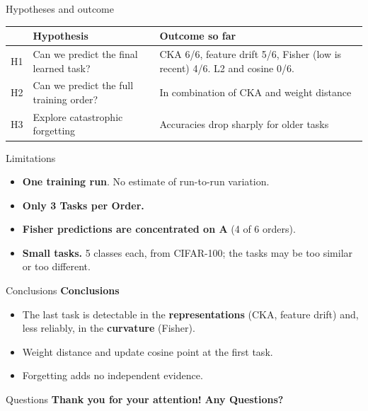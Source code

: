 \documentclass[aspectratio=169,11pt]{beamer}
\newcommand{\hl}[1]{{\color{accent}\bfseries #1}}
\begin{document}
\begin{frame}{Hypotheses and outcome}
  \small
  \renewcommand{\arraystretch}{1.3}
  \begin{tabular}{@{}p{0.6cm}p{4.6cm}p{6.6cm}@{}}
    \toprule
    & \textbf{Hypothesis} & \textbf{Outcome so far}\\
    \midrule
    H1 & Can we predict the final learned task? & CKA 6/6, feature drift 5/6, Fisher (low is recent) 4/6. L2 and cosine 0/6.\\
    H2 & Can we predict the full training order? & In combination of CKA and weight distance\\
    H3 & Explore catastrophic forgetting & Accuracies drop sharply for older tasks\\
    \bottomrule
  \end{tabular}
\end{frame}

\begin{frame}{Limitations}
  \begin{itemize}
    \item \textbf{One training run}. No estimate of run-to-run variation.
     \bigskip 
    \item \textbf{Only 3 Tasks per Order.} 
     \bigskip
     \item \textbf{Fisher predictions are concentrated on A} (4 of 6 orders).
     \bigskip
    \item \textbf{Small tasks.} 5 classes each, from CIFAR-100; the tasks may be too similar or too different.
  \end{itemize}
\end{frame}

\begin{frame}{Conclusions}
      \textbf{Conclusions}
      \bigskip
      \begin{itemize}
        \item The last task is detectable in the \hl{representations} (CKA, feature drift) and, less reliably, in the \hl{curvature} (Fisher).
        \item Weight distance and update cosine point at the first task.
        \item Forgetting adds no independent evidence.
      \end{itemize}
\end{frame}

\begin{frame}{Questions}
    \centering
    \textbf{Thank you for your attention!}
    \bigskip
    \textbf{Any Questions?}
\end{frame}
\end{document}
